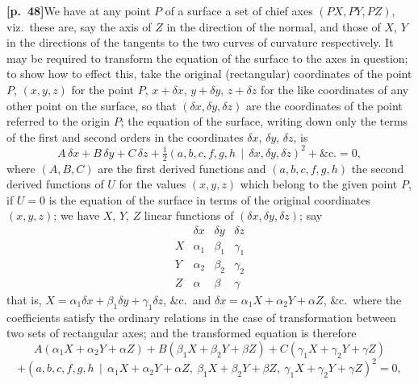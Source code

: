 \documentclass[11pt,a4paper]{article}
\begin{document}
\noindent\textbf{[p.~48]}\quad We have at any point $P$ of a surface a set of chief axes $(PX, PY, PZ)$, viz.\ these are, say the axis of $Z$ in the direction of the normal, and those of $X$, $Y$ in the directions of the tangents to the two curves of curvature respectively. It may be required to transform the equation of the surface to the axes in question; to show how to effect this, take the original (rectangular) coordinates of the point $P$, $(x, y, z)$ for the point $P$, $x + \delta x$, $y + \delta y$, $z + \delta z$ for the like coordinates of any other point on the surface, so that $(\delta x, \delta y, \delta z)$ are the coordinates of the point referred to the origin $P$; the equation of the surface, writing down only the terms of the first and second orders in the coordinates $\delta x$, $\delta y$, $\delta z$, is
\[
A\,\delta x + B\,\delta y + C\,\delta z + \tfrac{1}{2}(a, b, c, f, g, h\,\mid\, \delta x, \delta y, \delta z)^{2} + \&\text{c.} = 0,
\]
where $(A, B, C)$ are the first derived functions and $(a, b, c, f, g, h)$ the second derived functions of $U$ for the values $(x, y, z)$ which belong to the given point $P$, if $U = 0$ is the equation of the surface in terms of the original coordinates $(x, y, z)$; we have $X$, $Y$, $Z$ linear functions of $(\delta x, \delta y, \delta z)$; say
\[
\begin{array}{l|ccc}
 & \delta x & \delta y & \delta z \\\hline
X & \alpha_{1} & \beta_{1} & \gamma_{1} \\
Y & \alpha_{2} & \beta_{2} & \gamma_{2} \\
Z & \alpha & \beta & \gamma
\end{array}
\]
that is, $X = \alpha_{1}\delta x + \beta_{1}\delta y + \gamma_{1}\delta z$, \&c.\ and $\delta x = \alpha_{1}X + \alpha_{2}Y + \alpha Z$, \&c.\ where the coefficients satisfy the ordinary relations in the case of transformation between two sets of rectangular axes; and the transformed equation is therefore
\[
A(\alpha_{1}X + \alpha_{2}Y + \alpha Z) + B(\beta_{1}X + \beta_{2}Y + \beta Z) + C(\gamma_{1}X + \gamma_{2}Y + \gamma Z)
\]
\[
+ (a, b, c, f, g, h\,\mid\, \alpha_{1}X + \alpha_{2}Y + \alpha Z,\ \beta_{1}X + \beta_{2}Y + \beta Z,\ \gamma_{1}X + \gamma_{2}Y + \gamma Z)^{2} = 0,
\]

\bigskip
\end{document}
